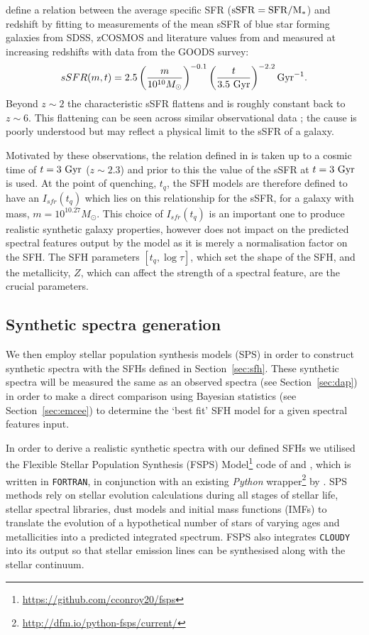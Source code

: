 \documentclass[useAMS,usenatbib]{mn2e}
\begin{document}
\citet[][Equation 1]{peng10} define a relation between the average specific SFR ($\rm{sSFR}=SFR/M_*$) and redshift by fitting to measurements of the mean sSFR of blue star forming galaxies from SDSS, zCOSMOS and literature values from \cite{elbaz07} and \cite{daddi07} measured at increasing redshifts with data from the GOODS survey:
\begin{equation}\label{eq:peng}
sSFR(m,t) = 2.5 \left( \frac{m}{10^{10} M_{\odot}} \right)^{-0.1} \left(\frac{t}{3.5 ~\rm{Gyr}}\right)^{-2.2} \rm{Gyr}^{-1}.
\end{equation}
Beyond $z \sim 2$ the characteristic sSFR flattens and is roughly constant back to $z\sim6$. This flattening can be seen across similar observational data \citep{peng10, gonzalez10, bethermin12}; the cause is poorly understood but may reflect a physical limit to the sSFR of a galaxy. 

Motivated by these observations, the relation defined in \citet{peng10} is taken up to a cosmic time of $t=3~\rm{Gyr}$ ($z \sim 2.3$) and prior to this the value of the sSFR at $t=3~\rm{Gyr}$ is used. At the point of quenching, $t_{q}$, the SFH models are therefore defined to have an $I_{sfr}(t_q)$ which lies on this relationship for the sSFR, for a galaxy with mass, $m = 10^{10.27} M_{\odot}$. This choice of $I_{sfr}(t_q)$ is an important one to produce realistic synthetic galaxy properties, however does not impact on the predicted spectral features output by the model as it is merely a normalisation factor on the SFH. The SFH parameters $[t_q, \log \tau]$, which set the shape of the SFH, and the metallicity, $Z$, which can affect the strength of a spectral feature, are the crucial parameters.

\subsection{Synthetic spectra generation}\label{sec:fsps}

We then employ stellar population synthesis models (SPS) in order to construct synthetic spectra with the SFHs defined in Section~\ref{sec:sfh}. These synthetic spectra will be measured the same as an observed spectra (see Section~\ref{sec:dap}) in order to make a direct comparison using Bayesian statistics (see Section~\ref{sec:emcee}) to determine the `best fit' SFH model for a given spectral features input. 

In order to derive a realistic synthetic spectra with our defined SFHs we utilised the Flexible Stellar Population Synthesis (FSPS) Model\footnote{\url{https://github.com/cconroy20/fsps}} code of \cite{conroy09} and \citet{conroy10}, which is written in \texttt{FORTRAN}, in conjunction with an existing \emph{Python} wrapper\footnote{\url{http://dfm.io/python-fsps/current/}} by \cite{python_fsps}. SPS methods rely on stellar evolution calculations during all stages of stellar life, stellar spectral libraries, dust models and initial mass functions (IMFs) to translate the evolution of a hypothetical number of stars of varying ages and metallicities into a predicted integrated spectrum. FSPS also integrates \texttt{CLOUDY} \citep{ferland13} into its output so that stellar emission lines can be synthesised along with the stellar continuum. 
\end{document}
